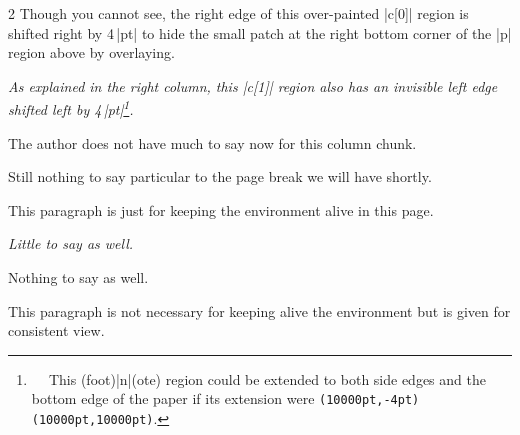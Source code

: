 \begin{paracol}{2}
Though you cannot see, the right edge of this over-painted |c[0]| region
is shifted right by 4\,|pt| to hide the small patch at the right bottom
corner of the |p| region above by overlaying.

\switchcolumn
\begingroup\it
As explained in the right column, this {\rm|c[1]|} region also has an
invisible left edge shifted left by {\rm4\,|pt|}\footnote{

This (foot)|n|(ote) region could be extended to both side edges and the
bottom edge of the paper if its extension were
\texttt{(10000pt,-4pt)(10000pt,10000pt)}.\label{fn:bgpaint-inf2}}.
\endgroup


The author does not have much to say now for this column chunk.
\par\vfill

Still nothing to say particular to the page break we will have shortly.
\par\newpage

This paragraph is just for keeping the  environment alive in
this page.
\switchcolumn

\begingroup\it
Little to say as well.
\par\vfill

Nothing to say as well.
\par\newpage

This paragraph is not necessary for keeping alive the environment but is
given for consistent view.
\endgroup

\end{paracol}
\bigskip

